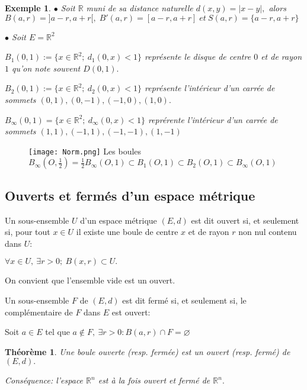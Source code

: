 \documentclass[11pt,a4paper]{report}
\newtheorem{theorem}{Théorème}[section]
\newtheorem{ex}{Exemple}[section]
\begin{document}
\begin{ex}
$\bullet$ Soit $\mathbb{R}$ muni de sa distance naturelle $d(x,y)=|x-y|,$ alors $B(a,r)=]a-r,a+r[,\;B'(a,r)=[a-r,a+r]\;et\:S(a,r)=\{a-r,a+r\}$

$\bullet$ Soit $E=\mathbb{R}^2$

$B_1(0,1):=\{x\in \mathbb{R}^2;\:d_1(0,x)< 1\}$ représente le disque de centre $0$ et de rayon $1$ qu'on note souvent $D(0,1).$

$B_2(0,1):=\{x\in \mathbb{R}^2;\:d_2(0,x)< 1\}$ représente l'intérieur d'un carrée de sommets $(0,1),(0,-1),(-1,0),(1,0).$

$B_{\infty}(0,1)=\{x\in \mathbb{R}^2;\:d_{\infty}(0,x)< 1\}$ reprérente l'intérieur d'un carrée de sommets $(1,1),(-1,1),(-1,-1),(1,-1)$
\end{ex}


\begin{figure}%
\begin{center}
\texttt{[image: Norm.png]}
Les boules $B_{\infty}(O,\frac{1}{2})=\frac{1}{2}B_{\infty}(O,1)\subset B_1 (O,1)\subset B_2 (O,1)\subset B_{\infty}(O,1)$
\end{center}
\end{figure}

\subsection{Ouverts et fermés d'un espace métrique}
Un sous-ensemble $U$ d'un espace métrique $(E,d)$ est dit ouvert si, et seulement si, pour tout $x\in U$ il existe une boule de centre $x$ et de rayon $r$ non nul contenu dans $U:$

$\forall x\in U,\:\exists r>0;\:B(x,r)\subset U.$

On convient que l'ensemble vide est un ouvert.

Un sous-ensemble $F$ de $(E,d)$ est dit fermé si, et seulement si, le complémentaire de $F$ dans $E$ est ouvert:

Soit $a\in E$ tel que $a\notin F,\:\exists r>0:B(a,r)\cap F=\varnothing $





\begin{theorem}

Une boule ouverte (resp. fermée) est un ouvert (resp. fermé) de $(E,d).$

Conséquence: l'espace $\mathbb{R}^n$ est à la fois ouvert et fermé de $\mathbb{R}^n.$

\end{theorem}
\end{document}
